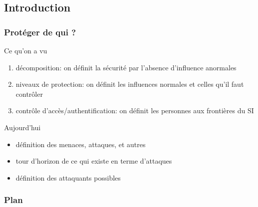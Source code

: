 

  
\usepackage{ifthen}


\def\txthl#1{ \ifthenelse{\lengthtest{#1 pt<0.5pt}}{\top}{\bot} }



\begin{reveals}
		
\maketitle


\section{Introduction}

\begin{frame}
  \frametitle{Protéger de qui ?}

  \vfill

  \begin{block}{Ce qu'on a vu}
    \begin{enumerate}
    \item décomposition: on définit la sécurité par l'absence
      d'influence anormales
    \item niveaux de protection: on définit les influences normales et
      celles qu'il faut contrôler
    \item contrôle d'accès/authentification: on définit les personnes
      aux frontières du SI
    \end{enumerate}
  \end{block}

  \vfill

  \begin{block}{Aujourd'hui}
    \begin{itemize}
    \item définition des menaces, attaques, et autres
    \item tour d'horizon de ce qui existe en terme d'attaques
    \item définition des attaquants possibles
    \end{itemize}
  \end{block}

  \vfill
\end{frame}

\begin{frame}
  \frametitle{Plan}


\end{frame}
\end{reveals}
